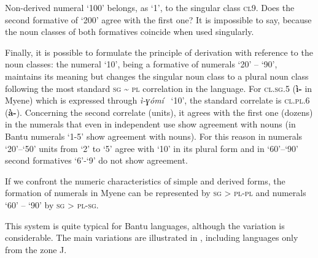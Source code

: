 Non-derived numeral ‘100’ belongs, as ‘1’, to the singular class \textsc{cl}9. Does the second formative of ‘200’ agree with the first one? It is impossible to say, because the noun classes of both formatives coincide when used singularly. 

Finally, it is possible to formulate the principle of derivation with reference to the noun classes: the numeral ‘10’, being a formative of numerals ‘20’ – ‘90’, maintains its meaning but changes the singular noun class to a plural noun class following the most standard \textsc{sg} {\textasciitilde} \textsc{pl} correlation in the language. For \textsc{cl}.\textsc{sg}.5 (\textbf{ì-} in Myene) which is expressed through \textit{ì-}\textit{ɣómí} ~‘10’, the standard correlate is \textsc{cl}.\textsc{pl}.6 (\textbf{à-}). Concerning the second correlate (units), it agrees with the first one (dozens) in the numerals that even in independent use show agreement with nouns (in Bantu numerals ‘1-5’ show agreement with nouns). For this reason in numerals ‘20’–‘50’ units from ‘2’ to ‘5’ agree with ‘10’ in its plural form and in ‘60’–‘90’ second formatives ‘6’-‘9’ do not show agreement. 

If we confront the numeric characteristics of simple and derived forms, the formation of numerals in Myene can be represented by \textsc{sg} > \textsc{pl}-\textsc{pl} and numerals ‘60’ – ‘90’ by \textsc{sg} > \textsc{pl}-\textsc{sg}.

This system is quite typical for Bantu languages, although the variation is considerable. The main variations are illustrated in , including languages only from the zone J.


